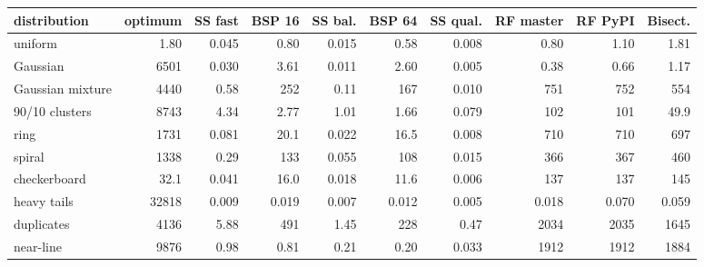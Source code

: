\begin{tabular}{lrrrrrrrrr}
\toprule
distribution & optimum & SS fast & BSP 16 & SS bal. & BSP 64 & SS qual. & RF master & RF PyPI & Bisect. \\
\midrule
uniform & 1.80 & 0.045 & 0.80 & 0.015 & 0.58 & 0.008 & 0.80 & 1.10 & 1.81 \\
Gaussian & 6501 & 0.030 & 3.61 & 0.011 & 2.60 & 0.005 & 0.38 & 0.66 & 1.17 \\
Gaussian mixture & 4440 & 0.58 & 252 & 0.11 & 167 & 0.010 & 751 & 752 & 554 \\
90/10 clusters & 8743 & 4.34 & 2.77 & 1.01 & 1.66 & 0.079 & 102 & 101 & 49.9 \\
ring & 1731 & 0.081 & 20.1 & 0.022 & 16.5 & 0.008 & 710 & 710 & 697 \\
spiral & 1338 & 0.29 & 133 & 0.055 & 108 & 0.015 & 366 & 367 & 460 \\
checkerboard & 32.1 & 0.041 & 16.0 & 0.018 & 11.6 & 0.006 & 137 & 137 & 145 \\
heavy tails & 32818 & 0.009 & 0.019 & 0.007 & 0.012 & 0.005 & 0.018 & 0.070 & 0.059 \\
duplicates & 4136 & 5.88 & 491 & 1.45 & 228 & 0.47 & 2034 & 2035 & 1645 \\
near-line & 9876 & 0.98 & 0.81 & 0.21 & 0.20 & 0.033 & 1912 & 1912 & 1884 \\
\bottomrule
\end{tabular}
